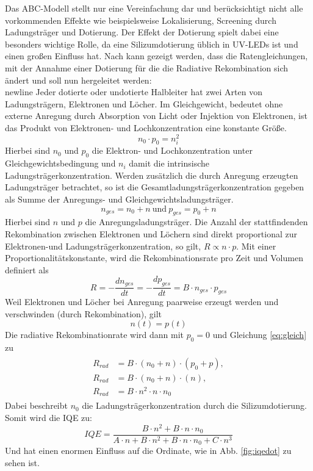 \vspace{0.1cm}
\noindent
Das ABC-Modell stellt nur eine Vereinfachung dar und berücksichtigt nicht alle vorkommenden Effekte wie beispielsweise Lokalisierung, Screening durch Ladungsträger und Dotierung. 
Der Effekt der Dotierung spielt dabei eine besonders wichtige Rolle, da eine Silizumdotierung üblich in UV-LEDs ist und einen großen Einfluss hat.
Nach \cite{schub} kann gezeigt werden, dass die Ratengleichungen, mit der Annahme einer Dotierung für die 
die Radiative Rekombination sich ändert und soll nun hergeleitet werden:
\\newline
Jeder dotierte oder undotierte Halbleiter hat zwei Arten von Ladungsträgern, Elektronen und Löcher.
Im Gleichgewicht, bedeutet ohne externe Anregung durch Absorption von Licht oder Injektion von Elektronen, ist das Produkt von Elektronen- und Lochkonzentration eine konstante Größe.
\begin{equation}
    n_0 \cdot p_0 = n_i^2
    \label{eq:constant}
\end{equation}
Hierbei sind $n_0$ und $p_0$ die Elektron- und Lochkonzentration unter Gleichgewichtsbedingung und $n_{i}$ damit die intrinsische Ladungsträgerkonzentration.
Werden zusätzlich die durch Anregung erzeugten Ladungsträger betrachtet, so ist die Gesamtladungsträgerkonzentration gegeben als Summe der Anregungs- und Gleichgewichtsladungsträger. 
\begin{equation}
    n_{ges} = n_0 + n \medspace \text{und} \medspace  p_{ges} = p_0 +  n 
\end{equation}
Hierbei sind $ n$ und $p$ die Anregungsladungsträger. 
Die Anzahl der stattfindenden Rekombination zwischen Elektronen und Löchern sind direkt proportional zur Elektronen-und Ladungsträgerkonzentration, so gilt, $R \propto n \cdot p $. Mit einer Proportionalitätskonstante, wird die Rekombinationsrate pro Zeit und Volumen definiert als
\begin{equation}
    R = - \frac{dn_{ges}}{dt} = - \frac{dp_{ges}}{dt} = B \cdot n_{ges} \cdot p_{ges}
\end{equation}
Weil Elektronen und Löcher bei Anregung paarweise erzeugt werden und verschwinden (durch Rekombination), gilt
\begin{equation}
    \label{eq:gleich}
    n(t) =  p(t)
\end{equation}
Die radiative Rekombinationrate wird dann mit $p_{0} = 0$ und Gleichung \ref{eq:gleich} zu
\begin{align}
\begin{split}
    R_{rad} &= B \cdot (n_0 + n)  \cdot (p_0 + p) ,
    \\
    R_{rad} &= B \cdot (n_0 + n) \cdot (n) ,
    \\
    R_{rad} &= B \cdot n^2 \cdot n \cdot n_0
\end{split}
\end{align}
Dabei beschreibt $n_{0}$ die Ladungsträgerkonzentration durch die Silizumdotierung. 
Somit wird die IQE zu:
\begin{equation}
    IQE = \frac{B \cdot n^2 + B \cdot n \cdot n_{0}}{A \cdot n + B \cdot n^2  + B \cdot n \cdot n_{0}+ C \cdot n^3} 
    \label{eq:dopediqe}
\end{equation}
Und hat einen enormen Einfluss auf die Ordinate, wie in Abb. \ref{fig:iqedot} zu sehen ist.
